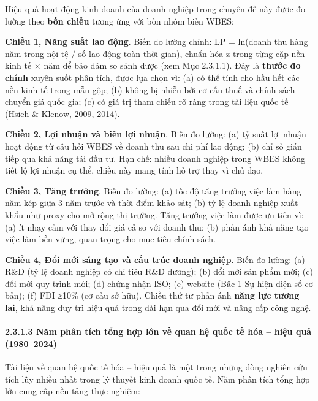 \documentclass[
  a4paper,
  13pt]{extreport}
\begin{document}
Hiệu quả hoạt động kinh doanh của doanh nghiệp trong chuyên đề này được
đo lường theo \textbf{bốn chiều} tương ứng với bốn nhóm biến WBES:

\textbf{Chiều 1, Năng suất lao động}. Biến đo lường chính: LP = ln(doanh
thu hàng năm trong nội tệ / số lao động toàn thời gian), chuẩn hóa z
trong từng cặp nền kinh tế × năm để bảo đảm so sánh được (xem Mục
2.3.1.1). Đây là \textbf{thước đo chính} xuyên suốt phân tích, được lựa
chọn vì: (a) có thể tính cho hầu hết các nền kinh tế trong mẫu gộp; (b)
không bị nhiễu bởi cơ cấu thuế và chính sách chuyển giá quốc gia; (c) có
giá trị tham chiếu rõ ràng trong tài liệu quốc tế (Hsieh \& Klenow,
2009, 2014).

\textbf{Chiều 2, Lợi nhuận và biên lợi nhuận}. Biến đo lường: (a) tỷ
suất lợi nhuận hoạt động từ câu hỏi WBES về doanh thu sau chi phí lao
động; (b) chỉ số gián tiếp qua khả năng tái đầu tư. Hạn chế: nhiều doanh
nghiệp trong WBES không tiết lộ lợi nhuận cụ thể, chiều này mang tính hỗ
trợ thay vì chủ đạo.

\textbf{Chiều 3, Tăng trưởng}. Biến đo lường: (a) tốc độ tăng trưởng
việc làm hàng năm kép giữa 3 năm trước và thời điểm khảo sát; (b) tỷ lệ
doanh nghiệp xuất khẩu như proxy cho mở rộng thị trường. Tăng trưởng
việc làm được ưu tiên vì: (a) ít nhạy cảm với thay đổi giá cả so với
doanh thu; (b) phản ánh khả năng tạo việc làm bền vững, quan trọng cho
mục tiêu chính sách.

\textbf{Chiều 4, Đổi mới sáng tạo và cấu trúc doanh nghiệp}. Biến đo
lường: (a) R\&D (tỷ lệ doanh nghiệp có chi tiêu R\&D dương); (b) đổi mới
sản phẩm mới; (c) đổi mới quy trình mới; (d) chứng nhận ISO; (e) website
(Bậc 1 Sự hiện diện số cơ bản); (f) FDI ≥10\% (cơ cấu sở hữu). Chiều thứ
tư phản ánh \textbf{năng lực tương lai}, khả năng duy trì hiệu quả trong
dài hạn qua đổi mới và nâng cấp công nghệ.

\hypertarget{nux103m-phuxe2n-tuxedch-tux1ed5ng-hux1ee3p-lux1edbn-vux1ec1-quan-hux1ec7-quux1ed1c-tux1ebf-huxf3a-hiux1ec7u-quux1ea3-19802024}{%
\paragraph{2.3.1.3 Năm phân tích tổng hợp lớn về quan hệ quốc tế hóa --
hiệu quả
(1980--2024)}\label{nux103m-phuxe2n-tuxedch-tux1ed5ng-hux1ee3p-lux1edbn-vux1ec1-quan-hux1ec7-quux1ed1c-tux1ebf-huxf3a-hiux1ec7u-quux1ea3-19802024}}

Tài liệu về quan hệ quốc tế hóa -- hiệu quả là một trong những dòng
nghiên cứu tích lũy nhiều nhất trong lý thuyết kinh doanh quốc tế. Năm
phân tích tổng hợp lớn cung cấp nền tảng thực nghiệm:
\end{document}
